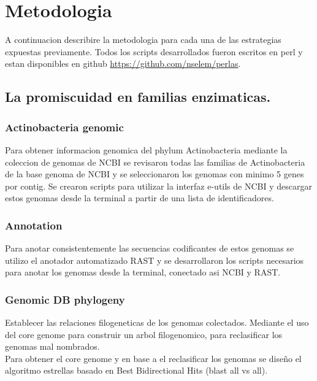 \documentclass[12pt,twoside]{reedthesis}
\begin{document}
  \section{Metodologia}\label{metodologia}
  
  A continuacion describire la metodologia para cada una de las
  estrategias expuestas previamente. Todos los scripts desarrollados
  fueron escritos en perl y estan disponibles en github
  \url{https://github.com/nselem/perlas}.
  
  \subsection{La promiscuidad en familias
  enzimaticas.}\label{la-promiscuidad-en-familias-enzimaticas.-1}
  
  \subsubsection{Actinobacteria genomic}\label{actinobacteria-genomic}
  
  Para obtener informacion genomica del phylum Actinobacteria mediante la
  coleccion de genomas de NCBI se revisaron todas las familias de
  Actinobacteria de la base genoma de NCBI y se seleccionaron los genomas
  con minimo 5 genes por contig. Se crearon scripts para utilizar la
  interfaz e-utils de NCBI y descargar estos genomas desde la terminal a
  partir de una lista de identificadores.
  
  \subsubsection{Annotation}\label{annotation}
  
  Para anotar consistentemente las secuencias codificantes de estos
  genomas se utilizo el anotador automatizado RAST y se desarrollaron los
  scripts necesarios para anotar los genomas desde la terminal, conectado
  asi NCBI y RAST.
  
  \subsubsection{Genomic DB phylogeny}\label{genomic-db-phylogeny}
  
  Establecer las relaciones filogeneticas de los genomas colectados.
  Mediante el uso del core genome para construir un arbol filogenomico,
  para reclasificar los genomas mal nombrados.\\
  Para obtener el core genome y en base a el reclasificar los genomas se
  diseño el algoritmo estrellas basado en Best Bidirectional Hits (blast
  all vs all).
  
\end{document}
